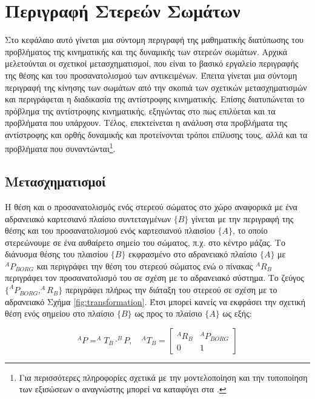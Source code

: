 \chapter{Περιγραφή Στερεών Σωμάτων}

Στο κεφάλαιο αυτό γίνεται μια σύντομη περιγραφή της μαθηματικής διατύπωσης του προβλήματος της κινηματικής και της δυναμικής των στερεών σωμάτων. Αρχικά μελετούνται οι σχετικοί μετασχηματισμοί, που είναι το βασικό εργαλείο περιγραφής της θέσης και του προσανατολισμού των αντικειμένων. Έπειτα γίνεται μια σύντομη περιγραφή της κίνησης των σωμάτων από την σκοπιά των σχετικών μετασχηματισμών και περιγράφεται η διαδικασία της αντίστροφης κινηματικής. Επίσης διατυπώνεται το πρόβλημα της αντίστροφης κινηματικής, εξηγώντας στο πως επιλύεται και τα προβλήματα που υπάρχουν. Τέλος, επεκτείνεται η ανάλυση στα προβλήματα της αντίστροφης και ορθής δυναμικής και προτείνονται τρόποι επίλυσης τους, αλλά και τα προβλήματα που συναντώνται\footnote{Για περισσότερες πληροφορίες σχετικά με την μοντελοποίηση και την τυποποίηση των εξισώσεων ο αναγνώστης μπορεί να καταφύγει στα \cite{craig95, murray94}.}.

\section{Μετασχηματισμοί}

Η θέση και ο προσανατολισμός ενός στερεού σώματος στο χώρο αναφορικά με ένα αδρανειακό καρτεσιανό πλαίσιο συντεταγμένων $\{Β\}$ γίνεται με την περιγραφή της θέσης και του προσανατολισμού ενός καρτεσιανού πλαισίου $\{Α\}$, το οποίο στερεώνουμε σε ένα αυθαίρετο σημείο του σώματος, π.χ. στο κέντρο μάζας. Το διάνυσμα θέσης του πλαισίου $\{Β\}$ εκφρασμένο στο αδρανειακό πλαίσιο $\{Α\}$ με $^AP_{BORG}$ και περιγράφει την θέση του στερεού σώματος ενώ ο πίνακας $^AR_B$ περιγράφει τον προσανατολισμό του σε σχέση με το αδρανειακό σύστημα. Το ζεύγος $\{^AP_{BORG}, ^AR_B\}$ περιγράφει πλήρως την διάταξη του στερεού σε σχέση με το αδρανειακό Σχήμα \ref{fig:transformation}. Έτσι μπορεί κανείς να εκφράσει την σχετική θέση ενός σημείου στο πλαίσιο $\{Β\}$ ως προς το πλαίσιο  $\{Α\}$ ως εξής:

\begin{equation}
    ^AP = ^AT_B \cdot ^BP, \quad
    ^AT_B =
    \begin{bmatrix}
        ^AR_B & ^AP_{BORG}\\
        0 & 1
    \end{bmatrix}
\end{equation}

